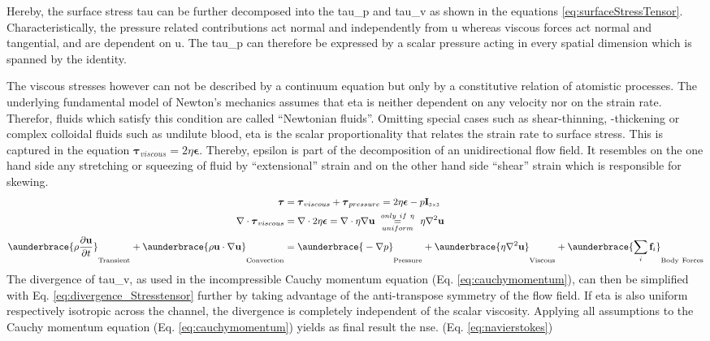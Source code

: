 Hereby, the surface stress \gls{tau} can be further decomposed into the \gls{tau_p} and \gls{tau_v} as shown in the equations \ref{eq:surfaceStressTensor}. Characteristically, the pressure related contributions act normal and independently from \gls{u} whereas viscous forces act normal and tangential, and are dependent on \gls{u}. The \gls{tau_p} can therefore be expressed by a scalar pressure acting in every spatial dimension which is spanned by the identity. 

The viscous stresses however can not be described by a continuum equation but only by a constitutive relation of atomistic processes. The underlying fundamental model of Newton's mechanics assumes that \gls{eta} is neither dependent on any velocity nor on the strain rate. Therefor, fluids which satisfy this condition are called ``Newtonian fluids''. Omitting special cases such as shear-thinning, -thickening or complex colloidal fluids such as undilute blood, \gls{eta} is the scalar proportionality that relates the strain rate to surface stress.\cite{lit:fluidic:kirby} This is captured in the equation $\boldsymbol{\tau}_{viscous} = 2\eta \mathbf{\epsilon} $. Thereby, \gls{epsilon} is part of the decomposition of an unidirectional flow field. It resembles on the one hand side any stretching or squeezing of fluid by ``extensional'' strain and on the other hand side ``shear'' strain which is responsible for skewing. \cite{lit:fluidic:kirby}
\begin{align}
	\boldsymbol{\tau} &= \boldsymbol{\tau}_{viscous} +  \boldsymbol{\tau}_{pressure} = 2\eta \boldsymbol{\epsilon} - p \mathbf{I}_{\scaleto{3 \times 3}{4pt}} \label{eq:surfaceStressTensor}\\
	\nabla \cdot \boldsymbol{\tau}_{viscous} &= \nabla \cdot 2\eta \boldsymbol{\epsilon} = \nabla \cdot \eta \nabla \mathbf{u} \ \underset{uniform}{\overset{only \ if \ \eta}{=}} \ \eta \nabla^2 \mathbf{u} 	\label{eq:divergence_Stresstensor} \\
	\aunderbrace{\vphantom{\sum_{i}} \rho \frac{\partial \mathbf{u}}{\partial t}}_{\mathrm{Transient}} + \aunderbrace{\vphantom{\sum_{i}}\rho\mathbf{u} \cdot \nabla \mathbf{u}}_{\mathrm{Convection}} &= \aunderbrace{\vphantom{\sum_{i}}-\nabla p}_{\mathrm{Pressure}} + \aunderbrace{\vphantom{\sum_{i}}\eta \nabla^2 \mathbf{u}}_{\mathrm{Viscous}} + \aunderbrace{\sum_{i}\mathbf{f}_i}_{\mathrm{Body \ Forces}} \label{eq:navierstokes}
\end{align}
The divergence of \gls{tau_v}, as used in the incompressible Cauchy momentum equation (Eq. \ref{eq:cauchymomentum}), can then be simplified with Eq. \ref{eq:divergence_Stresstensor} further by taking advantage of the anti-transpose symmetry of the flow field. If \gls{eta} is also uniform respectively isotropic across the channel, the divergence is completely independent of the scalar viscosity.  Applying all assumptions to the Cauchy momentum equation (Eq. \ref{eq:cauchymomentum}) yields as final result the \gls{nse}. (Eq. \ref{eq:navierstokes}) 

